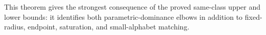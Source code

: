 This theorem gives the strongest consequence of the proved same-class upper and lower bounds: it identifies both parametric-dominance elbows in addition to fixed-radius, endpoint, saturation, and small-alphabet matching.
